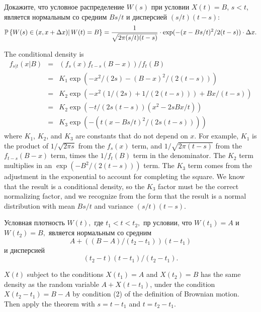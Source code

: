 \begin{problem}
  Докажите, что условное распределение $W(s)$ при условии $X(t)=B$, 
  $s < t $, является нормальным со средним $B s/t$ и дисперсией $(s/t)(t-s)$:
  $$
    \mathbb{P}\left\{ W(s) \in (x,x+\Delta x) |\, W(t) = B\right\} = 
    \frac{1}{\sqrt{2\pi (s/t)(t-s)}}\cdot \exp(-(x-Bs/t)^2/2(t-s)) \cdot\Delta x.
  $$

\end{problem} 
\begin{solution} 

The conditional density is
\begin{eqnarray*}
  f_{s|t}(x|B) &=& ( f_s(x) f_{t-s}(B-x) )/ f_t(B) \\
  &=& K_1 \exp( -x^2/(2s) - (B-x)^2/( 2(t-s) ) ) \\
  &=& K_2 \exp(-x^2(1/(2 s)+ 1/(2 (t-s) )) + Bx/(t-s) ) \\
  &=& K_2 \exp( -t/( 2 s (t-s) ) ( x^2 - 2 s B x/t) ) \\
  &=& K_3 \exp( - (t (x - B s/t)^2/ (2 s (t-s)) ) )
\end{eqnarray*}
where $ K_1 $, $ K_2 $, and $ K_3 $ are constants that do not depend on $
x $.  For example, $ K_1 $ is the product of $ 1/\sqrt{2 \pi s} $ from
the $ f_s(x) $ term, and $ 1/\sqrt{2 \pi (t-s)} $ from the $ f_{t-s}(B-x)
$ term, times the $ 1/f_t(B) $ term in the denominator.  The $ K_2 $
term multiplies in an $ \exp(-B^2/(2 (t-s))) $ term.  The $ K_3 $ term
comes from the adjustment in the exponential to account for completing
the square.  We know that the result is a conditional density, so the $
K_3 $ factor must be the correct normalizing factor, and we recognize
from the form that the result is a normal distribution with mean $ B s/t
$ and variance $ (s/t) (t-s) $. 
\end{solution}

\begin{problem}
 Условная плотность $W(t),$ где $t_1 < t < t_2,$ пр условии, что 
  $W(t_1)=A$ и $W(t_2) = B,$ является нормальным со средним
  $$
    A + ( (B-A)/(t_2-t_1) ) (t-t_1)
  $$
  \ni и дисперсией
  $$
    (t_2-t)(t-t_1)/(t_2-t_1).
  $$

\end{problem} 
\begin{solution} 
$ X(t) $ subject to the conditions $ X(t_1) = A $ and $ X(t_2)
= B $ has the same density as the random variable $ A + X(t-t_1) $,
under the condition $ X(t_2 - t_1) = B - A $ by condition (2) of the
definition of Brownian motion.  Then apply the theorem with $ s = t-t_1 $
and $ t = t_2 - t_1 $. 
\end{solution}

